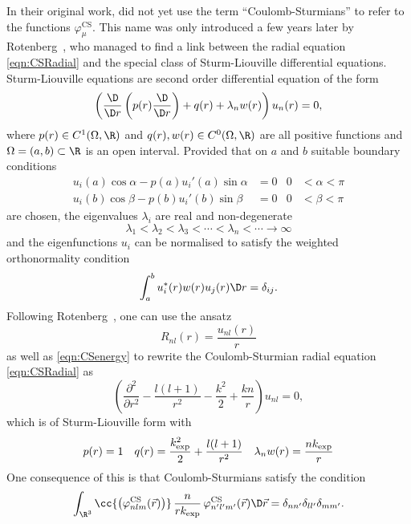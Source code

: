 In their original work, \citet{Shull1959} did not yet use the term ``Coulomb-Sturmians''
to refer to the functions $\varphi^\text{CS}_\mu$.
This name was only introduced a few years later
by Rotenberg~\cite{Rotenberg1962,Rotenberg1970},
who managed to find a link between the \CS radial equation \eqref{eqn:CSRadial}
and the special class of Sturm-Liouville differential equations.
Sturm-Liouville equations are second order differential equation of the form
\begin{equation}
	\left(
	\frac{\D}{\D r} \left( p(r) \frac{\D}{\D r} \right) + q(r) + \lambda_n w(r) \right) u_n(r) = 0,
	\label{eqn:SturmLiouville}
\end{equation}
where $p(r) \in C^1(\Omega, \R)$ and $q(r), w(r) \in C^0(\Omega, \R)$ are all positive
functions and $\Omega = (a,b) \subset \R$ is an open interval.
Provided that on $a$ and $b$ suitable boundary conditions
\begin{align*}
	u_i(a) \cos \alpha - p(a) u_i'(a) \sin \alpha &= 0 & 0 &< \alpha < \pi \\
	u_i(b) \cos \beta - p(b) u_i'(b) \sin \beta &= 0 & 0 &< \beta < \pi
\end{align*}
are chosen,
the eigenvalues $\lambda_i$ are real and non-degenerate
\[ \lambda_1 < \lambda_2 < \lambda_3 < \cdots < \lambda_n < \cdots \to \infty \]
and the eigenfunctions $u_i$ can be normalised
to satisfy the weighted orthonormality condition
\begin{equation}
	\int_a^b u_i^\ast(r) w(r) u_j(r) \D r = \delta_{ij}.
	\label{eqn:SturmLiouvilleWeightedOrtho}
\end{equation}
Following Rotenberg~\cite{Rotenberg1962,Rotenberg1970}, one can use the ansatz
\[ R_{nl}(r) = \frac{u_{nl}(r)}{r} \]
as well as \eqref{eqn:CSenergy} to rewrite the Coulomb-Sturmian radial equation
\eqref{eqn:CSRadial} as
\[ \left(\frac{\partial^2}{\partial r^2} - \frac{l (l+1)}{r^2} - \frac{k^2}{2} + \frac{kn}{r} \right)
u_{nl} = 0, \]
which is of Sturm-Liouville form with
\begin{align*}
	p(r) &= 1 & q(r) &= \frac{k_\text{exp}^2}{2} + \frac{l (l+1)}{r^2} & \lambda_n w(r) = \frac{nk_\text{exp}}{r}
\end{align*}
One consequence of this is that Coulomb-Sturmians satisfy
the  condition~\cite{Avery2006}
\begin{equation}
	\int_{\R^3} \cc{\left(\varphi^{\text{CS}}_{nlm}(\vec{r})\right)}\,
		\frac{n}{r\kexp} \, \varphi^\text{CS}_{n'l'm'}(\vec{r})
		\D \vec{r} = \delta_{n n'} \delta_{l l'} \delta_{m m'}.
	\label{eqn:CoulombSturmianWeightedOrtho}
\end{equation}

